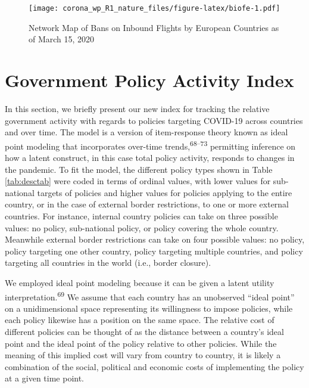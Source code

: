 \documentclass[
]{article}
\begin{document}
\begin{figure}
\centering
\texttt{[image: corona\_wp\_R1\_nature\_files/figure-latex/biofe-1.pdf]}
\caption{\label{fig:biofe}Network Map of Bans on Inbound Flights by European Countries as of March 15, 2020}
\end{figure}

\hypertarget{government-policy-activity-index}{%
\section*{Government Policy Activity Index}\label{government-policy-activity-index}}

In this section, we briefly present our new index for tracking the relative government activity with regards to policies targeting COVID-19 across countries and over time. The model is a version of item-response theory known as ideal point modeling that incorporates over-time trends,\textsuperscript{68--73} permitting inference on how a latent construct, in this case total policy activity, responds to changes in the pandemic. To fit the model, the different policy types shown in Table \ref{tab:desctab} were coded in terms of ordinal values, with lower values for sub-national targets of policies and higher values for policies applying to the entire country, or in the case of external border restrictions, to one or more external countries. For instance, internal country policies can take on three possible values: no policy, sub-national policy, or policy covering the whole country. Meanwhile external border restrictions can take on four possible values: no policy, policy targeting one other country, policy targeting multiple countries, and policy targeting all countries in the world (i.e., border closure).

We employed ideal point modeling because it can be given a latent utility interpretation.\textsuperscript{69} We assume that each country has an unobserved ``ideal point'' on a unidimensional space representing its willingness to impose policies, while each policy likewise has a position on the same space. The relative cost of different policies can be thought of as the distance between a country's ideal point and the ideal point of the policy relative to other policies. While the meaning of this implied cost will vary from country to country, it is likely a combination of the social, political and economic costs of implementing the policy at a given time point.
\end{document}
